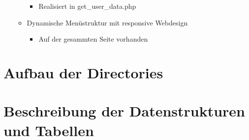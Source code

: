 \documentclass{report}
\begin{document}
\begin{itemize}
\begin{itemize}
            \begin{itemize}
                \item Realisiert in get\_user\_data.php
            \end{itemize}
        \item Dynamische Menüstruktur mit responsive Webdesign\\
            \begin{itemize}
                \item Auf der gesammten Seite vorhanden
            \end{itemize}
    \end{itemize}
\end{itemize}
\label{tab:my_label}

\section{Aufbau der Directories}

\section{Beschreibung der Datenstrukturen und Tabellen}
\end{document}
